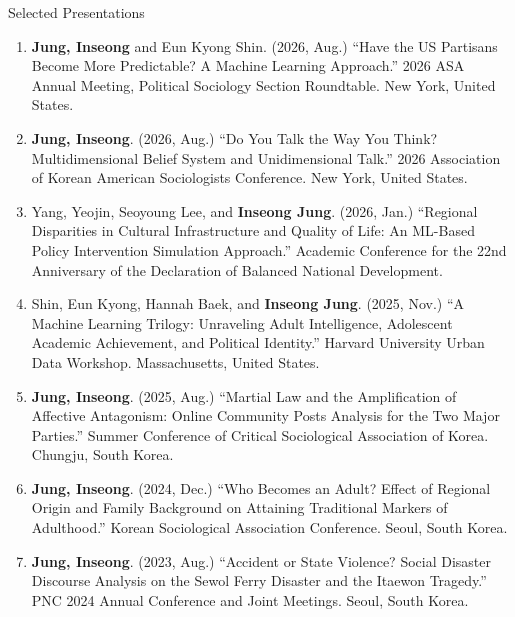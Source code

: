 \documentclass{resume} %
\begin{document}
\begin{rSection}{Selected Presentations}

\begin{enumerate}
  \item {\bf Jung, Inseong} and Eun Kyong Shin. (2026, Aug.)
  ``Have the US Partisans Become More Predictable? A Machine Learning Approach.''
  2026 ASA Annual Meeting, Political Sociology Section Roundtable.
  New York, United States.

  \item {\bf Jung, Inseong}. (2026, Aug.)
  ``Do You Talk the Way You Think? Multidimensional Belief System and Unidimensional Talk.''
  2026 Association of Korean American Sociologists Conference.
  New York, United States.


  \item Yang, Yeojin, Seoyoung Lee, and {\bf Inseong Jung}. (2026, Jan.)
  ``Regional Disparities in Cultural Infrastructure and Quality of Life: An ML-Based Policy Intervention Simulation Approach.''
  Academic Conference for the 22nd Anniversary of the Declaration of Balanced National Development.


  \item Shin, Eun Kyong, Hannah Baek, and {\bf Inseong Jung}. (2025, Nov.)
  ``A Machine Learning Trilogy: Unraveling Adult Intelligence, Adolescent Academic
  Achievement, and Political Identity.''
  Harvard University Urban Data Workshop.
  Massachusetts, United States.

  \item {\bf Jung, Inseong}. (2025, Aug.)
  ``Martial Law and the Amplification of Affective Antagonism:
  Online Community Posts Analysis for the Two Major Parties.''
  Summer Conference of Critical Sociological Association of Korea.
  Chungju, South Korea.

  \item {\bf Jung, Inseong}. (2024, Dec.)
  ``Who Becomes an Adult? Effect of Regional Origin and Family Background
  on Attaining Traditional Markers of Adulthood.''
  Korean Sociological Association Conference.
  Seoul, South Korea.

  \item {\bf Jung, Inseong}. (2023, Aug.)
  ``Accident or State Violence? Social Disaster Discourse Analysis on
  the Sewol Ferry Disaster and the Itaewon Tragedy.''
  PNC 2024 Annual Conference and Joint Meetings.
  Seoul, South Korea.
\end{enumerate}

\end{rSection}
\end{document}
